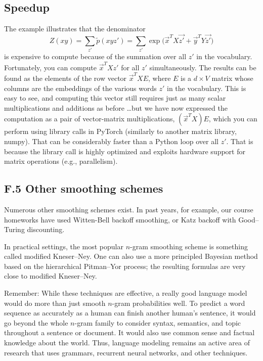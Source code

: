 \documentclass[12pt]{article}
\theoremstyle{plain}
\theoremstyle{definition}
\theoremstyle{remark}
\begin{document}
\subsection*{Speedup}
The example illustrates that the denominator
\[
Z(xy) = \sum_{z'} \tilde{p}(xyz') = \sum_{z'} \exp\big(\vec{x}^T X \vec{z'} + \vec{y}^T Y \vec{z'}\big)
\tag{13}
\]
is expensive to compute because of the summation over all $z'$ in the vocabulary. Fortunately, you can compute $\vec{x}^T X z'$ for all $z'$ simultaneously. The results can be found as the elements of the row vector $\vec{x}^T X E$, where $E$ is a $d \times V$ matrix whose columns are the embeddings of the various words $z'$ in the vocabulary. This is easy to see, and computing this vector still requires just as many scalar multiplications and additions as before \ldots but we have now expressed the computation as a pair of vector-matrix multiplications, $(\vec{x}^T X)E$, which you can perform using library calls in PyTorch (similarly to another matrix library, numpy). That can be considerably faster than a Python loop over all $z'$. That is because the library call is highly optimized and exploits hardware support for matrix operations (e.g., parallelism).

\subsection*{F.5 Other smoothing schemes}
Numerous other smoothing schemes exist. In past years, for example, our course homeworks have used Witten-Bell backoff smoothing, or Katz backoff with Good–Turing discounting.  

In practical settings, the most popular $n$-gram smoothing scheme is something called modified Kneser–Ney. One can also use a more principled Bayesian method based on the hierarchical Pitman–Yor process; the resulting formulas are very close to modified Kneser–Ney.  

Remember: While these techniques are effective, a really good language model would do more than just smooth $n$-gram probabilities well. To predict a word sequence as accurately as a human can finish another human’s sentence, it would go beyond the whole $n$-gram family to consider syntax, semantics, and topic throughout a sentence or document. It would also use common sense and factual knowledge about the world. Thus, language modeling remains an active area of research that uses grammars, recurrent neural networks, and other techniques.  
\end{document}
